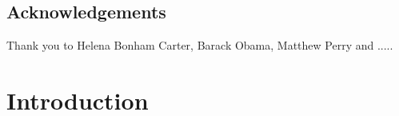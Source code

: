 \documentclass[a4paper]{book}
\numberwithin{mytheorem}{chapter}
\numberwithin{equation}{section}
\begin{document}
\section*{Acknowledgements}
\thispagestyle{empty}
Thank you to Helena Bonham Carter, Barack Obama, Matthew Perry and ..... 


\tableofcontents \thispagestyle{empty} 
\listoffigures \thispagestyle{empty} 
\listoftables \thispagestyle{empty} 
\newpage


\mainmatter

\chapter{Introduction}












\nocite{*}
\end{document}
